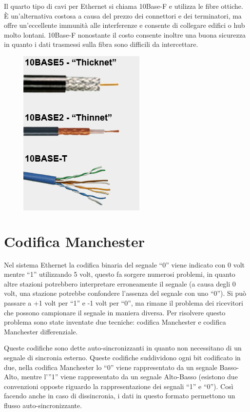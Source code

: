 Il quarto tipo di cavi per Ethernet si chiama 10Base-F e utilizza le fibre ottiche. È un’alternativa costosa a causa del prezzo dei connettori e dei terminatori, ma offre un’eccellente immunità alle interferenze e consente di collegare edifici o hub molto lontani. 10Base-F nonostante il costo consente inoltre una buona sicurezza in quanto i dati trasmessi sulla fibra sono difficili da intercettare.
 
\begin{figure}[H]
\centering
\includegraphics[scale=0.6]{res/img/27_CaviEthernet.png}
\end{figure}

\section{Codifica Manchester}

Nel sistema Ethernet la codifica binaria del segnale “0” viene indicato con 0 volt mentre “1” utilizzando 5 volt, questo fa sorgere numerosi problemi, in quanto altre stazioni potrebbero interpretare erroneamente il segnale (a causa degli 0 volt, una stazione potrebbe confondere l’assenza del segnale con uno “0”). Si può passare a +1 volt per “1” e -1 volt per “0”, ma rimane il problema dei ricevitori che possono campionare il segnale in maniera diversa.
Per risolvere questo problema sono state inventate due tecniche: codifica Manchester e codifica Manchester differenziale.

Queste codifiche sono dette auto-sincronizzanti in quanto non necessitano di un segnale di sincronia esterno.
Queste codifiche suddividono ogni bit codificato in due, nella codifica Manchester lo “0” viene rappresentato da un segnale Basso-Alto, mentre l’”1” viene rappresentato da un segnale Alto-Basso (esistono due convenzioni opposte riguardo la rappresentazione dei segnali “1” e “0”).
Così facendo anche in caso di dissincronia, i dati in questo formato permettono un flusso auto-sincronizzante.

